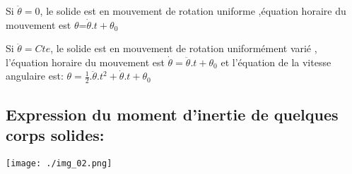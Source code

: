 \documentclass[12pt]{article}
\begin{document}
\begin{tcolorbox}

	Si $\ddot{\theta} = 0$, le solide est en mouvement de rotation uniforme ,équation horaire du mouvement est $ \theta $=$\dot{\theta}.t + \theta_0$

	Si $\ddot{\theta} = Cte$, le solide est en mouvement de rotation uniformément varié , l'équation horaire du mouvement est
	$ \dot\theta =  \ddot{\theta}.t + \theta_0$ et l'équation de la vitesse angulaire est: $ \theta =  \frac{1}{2}.\ddot{\theta}.t^2 + \dot\theta.t + \theta_0$
\end{tcolorbox}


\subsection{Expression du moment d'inertie de quelques corps solides:}

\begin{center}

	\texttt{[image: ./img\_02.png]}
\end{center}



\end{document}
